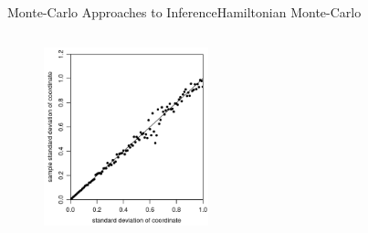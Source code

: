 \documentclass[AERbeamer%
              ,optEnglish%
              ,optBiber%
              ,optBibstyleAlphabetic%
              ,optBeamerClassicFormat%
              ]{AERlatex}%
\begin{document}
\begin{frame}[c]{Monte-Carlo Approaches to Inference}{Hamiltonian Monte-Carlo}
\begin{columns}
\begin{column}{0.48\textwidth}
\begin{figure}
            \end{figure}
            \begin{figure}
                \centering
                \includegraphics[width=0.424\textwidth]{HMCPerf3.png}
            \end{figure}
        \end{column}
    \end{columns}
\end{frame}
\end{document}
